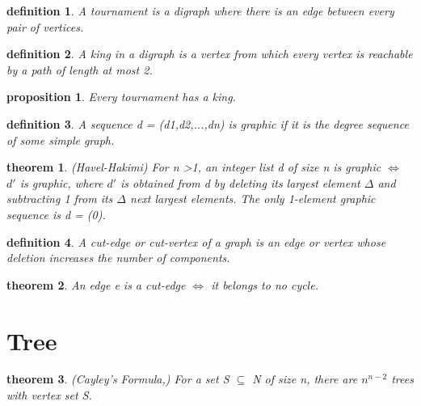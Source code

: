 \documentclass[twocolumn]{article}
\newtheorem{theorem}{theorem}[section]  %
\newtheorem{definition}{definition}
\newtheorem{proposition}{proposition}
\begin{document}
\begin{CJK*}{UTF8}{bkai}
    \begin{definition}
        A tournament is a digraph where there is an edge between every pair of
 vertices.
    \end{definition}

    \begin{definition}
         A king in a digraph is a vertex from which every vertex is reachable by a path
 of length at most 2.
    \end{definition}

    \begin{proposition}
        Every tournament has a king.
    \end{proposition}

    \begin{definition}
         A sequence d = (d1,d2,...,dn) is graphic if it is the degree sequence of some
 simple graph.
    \end{definition}

    \begin{theorem}{(Havel-Hakimi)}
         For n >1, an integer list d of size n is graphic $\iff$ $d\prime$ is graphic, where $d\prime$ is
 obtained from d by deleting its largest element $\Delta$ and subtracting 1 from its $\Delta$
 next largest elements. The only 1-element graphic sequence is d = (0).
    \end{theorem}

    \begin{definition}
         A cut-edge or cut-vertex of a graph is an edge or vertex whose deletion
 increases the number of components.
    \end{definition}

    \begin{theorem}
        An edge e is a cut-edge $\iff$ it belongs to no cycle.
    \end{theorem}

    
    


\section{Tree}

    \begin{theorem}{(Cayley's Formula,)}
         For a set S $\subseteq$ N of size n, there are $n^{n-2}$ trees with vertex set S.
    \end{theorem}


\end{CJK*}
\end{document}
